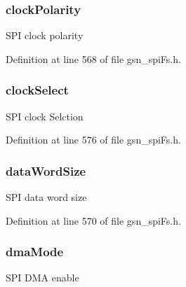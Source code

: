 \hypertarget{a00233_ab371d2331ec382e8dc467667ac9009d6}{
\subsubsection[{clockPolarity}]{ {\bf clockPolarity}}}
\label{a00233_ab371d2331ec382e8dc467667ac9009d6}
SPI clock polarity 

Definition at line 568 of file gsn\_\-spiFs.h.

\hypertarget{a00233_aafc9460aea176e2b77f84f6d8505b5dc}{
\subsubsection[{clockSelect}]{ {\bf clockSelect}}}
\label{a00233_aafc9460aea176e2b77f84f6d8505b5dc}
SPI clock Selction 

Definition at line 576 of file gsn\_\-spiFs.h.

\hypertarget{a00233_abaf4d32b527a323149448f3ffbf266fe}{
\subsubsection[{dataWordSize}]{ {\bf dataWordSize}}}
\label{a00233_abaf4d32b527a323149448f3ffbf266fe}
SPI data word size 

Definition at line 570 of file gsn\_\-spiFs.h.

\hypertarget{a00233_ac51b04e9415de12b2e97604acf5c3adc}{
\subsubsection[{dmaMode}]{ {\bf dmaMode}}}
\label{a00233_ac51b04e9415de12b2e97604acf5c3adc}
SPI DMA enable 

